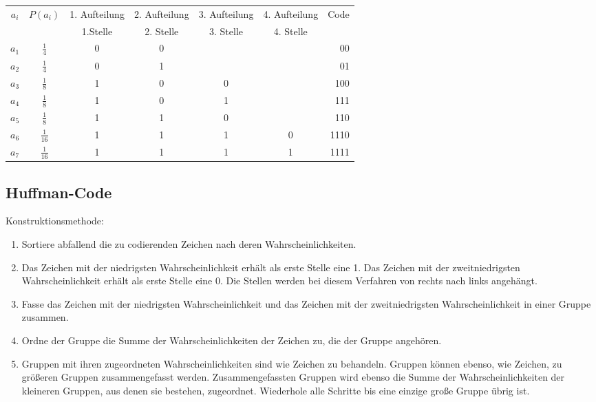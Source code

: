 \begin{center}
\begin{tabular}{cc*{4}{c}r}
	$a_i$ & $P(a_i)$       & 1. Aufteilung & 2. Aufteilung & 3. Aufteilung & 4. Aufteilung & Code \\
	      &                & 1.Stelle      & 2. Stelle     & 3. Stelle     & 4. Stelle     &      \\
	$a_1$ & $\frac{1}{4}$  & 0             & 0             &               &               & 00   \\
	$a_2$ & $\frac{1}{4}$  & 0             & 1             &               &               & 01   \\
	$a_3$ & $\frac{1}{8}$  & 1             & 0             & 0             &               & 100  \\
	$a_4$ & $\frac{1}{8}$  & 1             & 0             & 1             &               & 111  \\
	$a_5$ & $\frac{1}{8}$  & 1             & 1             & 0             &               & 110  \\
	$a_6$ & $\frac{1}{16}$ & 1             & 1             & 1             & 0             & 1110 \\
	$a_7$ & $\frac{1}{16}$ & 1             & 1             & 1             & 1             & 1111 \\
\end{tabular}
\end{center}

\subsection{Huffman-Code}
Konstruktionsmethode:
\begin{enumerate}
  \item Sortiere abfallend die zu codierenden Zeichen nach deren Wahrscheinlichkeiten.
  \item Das Zeichen mit der niedrigsten Wahrscheinlichkeit erhält als erste Stelle eine 1. Das Zeichen mit der zweitniedrigsten Wahrscheinlichkeit erhält als erste Stelle eine 0. Die Stellen werden bei diesem Verfahren von rechts nach links angehängt.
  \item Fasse das Zeichen mit der niedrigsten Wahrscheinlichkeit und das Zeichen mit der zweitniedrigsten Wahrscheinlichkeit in einer Gruppe zusammen.
  \item Ordne der Gruppe die Summe der Wahrscheinlichkeiten der Zeichen zu, die der Gruppe angehören.
  \item Gruppen mit ihren zugeordneten Wahrscheinlichkeiten sind wie Zeichen zu behandeln. Gruppen können ebenso, wie Zeichen, zu größeren Gruppen zusammengefasst werden. Zusammengefassten Gruppen wird ebenso die Summe der Wahrscheinlichkeiten der kleineren Gruppen, aus denen sie bestehen, zugeordnet. Wiederhole alle Schritte bis eine einzige große Gruppe übrig ist.
\end{enumerate}

